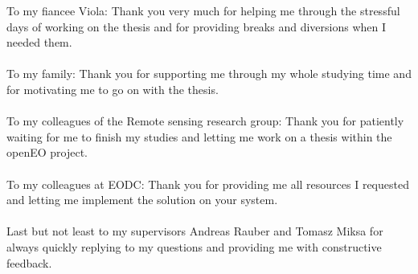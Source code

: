 \documentclass[draft,final]{vutinfth} %
\begin{document}
\frontmatter %

\addstatementpage




\begin{acknowledgements*}
To my fiancee Viola: Thank you very much for helping me through the stressful days of working on the thesis and for providing breaks and diversions when I needed them.\\ \\
To my family: Thank you for supporting me through my whole studying time and for motivating me to go on with the thesis. \\ \\
To my colleagues of the Remote sensing research group: Thank you for patiently waiting for me to finish my studies and letting me work on a thesis within the openEO project. \\ \\
To my colleagues at EODC: Thank you for providing me all resources I requested and letting me implement the solution on your system. \\ \\
Last but not least to my supervisors Andreas Rauber and Tomasz Miksa for always quickly replying to my questions and providing me with constructive feedback. 
\end{acknowledgements*}
\end{document}
